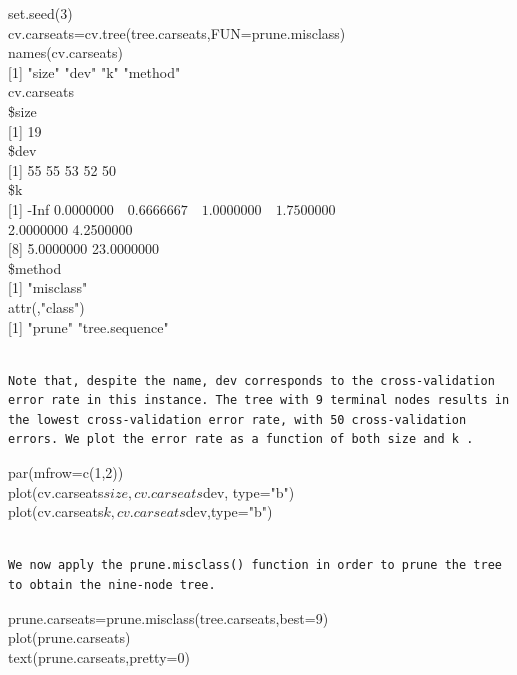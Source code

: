 \documentclass[10pt]{article}
\begin{document}
\begin{displayquote}
set.seed(3)\\
cv.carseats=cv.tree(tree.carseats,FUN=prune.misclass)\\
names(cv.carseats)\\[0pt]
[1] "size" "dev" "k" "method"\\
cv.carseats\\
\$size\\[0pt]
[1] 19\\
\$dev\\[0pt]
[1] 55 55 53 52 50\\
\$k\\[0pt]
[1] -Inf $0.0000000 \quad 0.6666667 \quad 1.0000000 \quad 1.7500000$\\
2.0000000 4.2500000\\[0pt]
[8] 5.0000000 23.0000000\\
\$method\\[0pt]
[1] "misclass"\\
attr(,"class")\\[0pt]
[1] "prune" "tree.sequence"
\end{displayquote}

\begin{verbatim}

Note that, despite the name, dev corresponds to the cross-validation error rate in this instance. The tree with 9 terminal nodes results in the lowest cross-validation error rate, with 50 cross-validation errors. We plot the error rate as a function of both size and k .
\end{verbatim}

\begin{displayquote}
par(mfrow=c(1,2))\\
plot(cv.carseats$size,cv.carseats$dev, type="b")\\
plot(cv.carseats$k,cv.carseats$dev,type="b")
\end{displayquote}

\begin{verbatim}

We now apply the prune.misclass() function in order to prune the tree to obtain the nine-node tree.
\end{verbatim}

\begin{displayquote}
prune.carseats=prune.misclass(tree.carseats,best=9)\\
plot(prune.carseats)\\
text(prune.carseats,pretty=0)
\end{displayquote}
\end{document}
